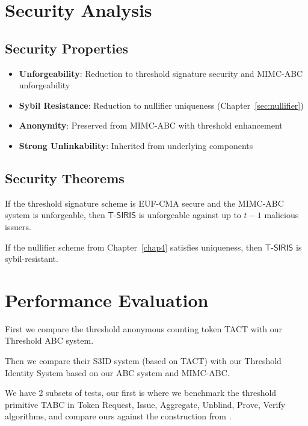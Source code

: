 \section{Security Analysis}
\label{sec:threshold-security}

\subsection{Security Properties}
\begin{itemize}
    \item \textbf{Unforgeability}: Reduction to threshold signature security and MIMC-ABC unforgeability
    \item \textbf{Sybil Resistance}: Reduction to nullifier uniqueness (Chapter~\ref{sec:nullifier})
    \item \textbf{Anonymity}: Preserved from MIMC-ABC with threshold enhancement
    \item \textbf{Strong Unlinkability}: Inherited from underlying components
\end{itemize}

\subsection{Security Theorems}
\begin{theorem}[Unforgeability]
If the threshold signature scheme is EUF-CMA secure and the MIMC-ABC system is unforgeable, then $\mathsf{T\text{-}SIRIS}$ is unforgeable against up to $t-1$ malicious issuers.
\end{theorem}

\begin{theorem}
If the nullifier scheme from Chapter~\ref{chap4} satisfies uniqueness, then $\mathsf{T\text{-}SIRIS}$ is sybil-resistant.
\end{theorem}

\newpage
\section{Performance Evaluation}

First we compare the threshold anonymous counting token TACT with our Threshold ABC system. 

Then we compare their S3ID system (based on TACT) with our Threshold Identity System based on our ABC system and MIMC-ABC. 


\label{sec:threshold-performance-tact}
We have 2 subsets of tests, our first is where we benchmark the threshold primitive TABC in Token Request, Issue, Aggregate, Unblind, Prove, Verify algorithms, and compare ours against the construction from \cite{rabaninejad_attribute-based_2024}.

